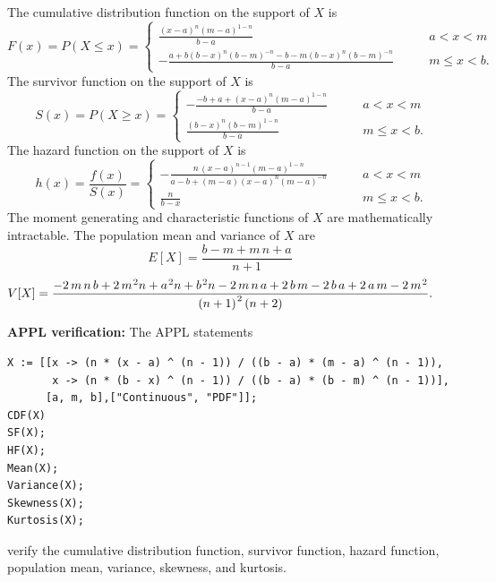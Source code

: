 \documentclass[12pt,fullpage]{article}
\begin{document}
\noindent		
The cumulative distribution function on
the support of $X$ is 
$$
F(x) = P(X \le x) = \left\{ \begin{array}{ll}
		\frac { \left( x - a \right) ^ {n} \left( m - a \right) ^ {1-n}}
{b - a} & \qquad a < x < m \\
		- \frac {a + b(b - x)^n(b-m)^{-n} - b - m(b-x)^n(b-m)^{-n}}{
b - a} & \qquad m \leq x < b.
		\end{array} \right. \, 
$$
The survivor function on the support of $X$ is
$$
S(x) = P(X \ge x) = \left\{ \begin{array}{ll}
		-\frac {-b + a +\left( x - a \right) ^ {n} \left( m - a \right) ^
{1 -n}}{b - a} & \qquad a < x < m \\
		\frac { \left( b - x \right) ^ {n} \left( b - m
 \right) ^ {1 -n}}{b - a} & \qquad m \leq x < b.
		\end{array} \right. \, 
$$
The hazard function on the support of $X$ is
$$
h(x) = \frac{f(x)} {S(x)} = \left\{ \begin{array}{ll}
		-\frac {n \, \left( x - a \right) ^ {n - 1} \left( m - a \right) ^
{1-n}}{a - b +  (m - a)
 \left( x - a \right) ^ {n} \left( m - a \right) ^ {-n}}  & \qquad a < x < m \\
		{\frac{n}{b - x}} & \qquad m \leq x < b.
		\end{array} \right. \, 
$$
The moment generating and characteristic functions of $X$ are mathematically intractable. The population mean and variance of $X$ are
$$
E[X] = {\frac {b - m + m \, n + a}{n + 1}} \quad \quad 
$$
$$
V[X] = {\frac {-2 \, m \, n \, b + 2 \, {m} ^ {\kern 0.08 em 2} n + {a} ^ {\kern 0.08 em 2} n + {b} ^ {\kern 0.08 em 2} n - 2 \, m \, n \, a + 2 \, b \, m - 2
\, b \, a + 2 \, a \, m - 2 \, {m} ^ {\kern 0.08 em 2}} { \left( n + 1 \right) ^ {\kern 0.08 em 2} \left( n + 2
 \right) }}. \quad \quad 
$$

\vspace{0.05in}

\noindent
{\bf APPL verification:}
The APPL statements
\begin{verbatim}
X := [[x -> (n * (x - a) ^ (n - 1)) / ((b - a) * (m - a) ^ (n - 1)),
       x -> (n * (b - x) ^ (n - 1)) / ((b - a) * (b - m) ^ (n - 1))],
      [a, m, b],["Continuous", "PDF"]];
CDF(X)
SF(X);
HF(X);
Mean(X);
Variance(X);
Skewness(X);
Kurtosis(X);
\end{verbatim}
verify the cumulative distribution function, survivor function, hazard function, population mean, variance, skewness, and kurtosis.
\end{document}
